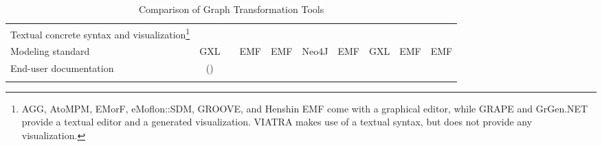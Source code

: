 \begin{longtable}{p{41mm}|ccc|ccc|ccc}
	\midrule
	Textual concrete syntax and visualization\footnote{AGG, AtoMPM, EMorF, eMoflon::SDM, GROOVE, and Henshin EMF come with a graphical editor,
		while GRAPE and GrGen.NET provide a textual editor and a generated visualization.
		VIATRA makes use of a textual syntax, but does not provide any visualization.}
	& \no
	& \no
	& \no
	& \no
	& \yes
	& \yes
	& \no
	& \no
	& \no \\
	Modeling standard
	& GXL
	& \no
	& EMF
	& EMF
	& Neo4J
	& EMF
	& GXL
	& EMF
	& EMF \\
	End-user documentation
	& (\yes)
	& \yes
	& \yes
	& \no
	& \yes
	& \yes
	& \yes
	& \yes
	& \yes \\
	\bottomrule 
	\caption{Comparison of Graph Transformation Tools}
	\label{fig-comparison}
\end{longtable}
